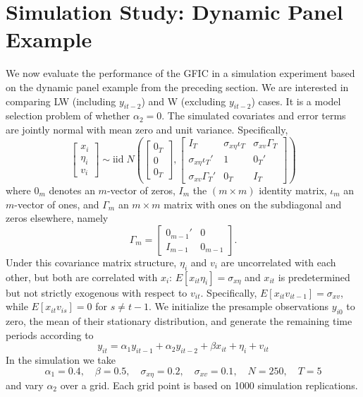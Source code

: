 \section{Simulation Study: Dynamic Panel Example}
We now evaluate the performance of the GFIC in a simulation experiment based on the dynamic panel example from the preceding section. We are interested in comparing LW (including $y_{it-2}$) and W (excluding $y_{it-2}$) cases. It is a model selection problem of whether $\alpha_2=0$. The simulated covariates and error terms are jointly normal with mean zero and unit variance. Specifically,
	\begin{equation}
		\left[\begin{array}{c}
			x_{i}\\
			\eta_i\\
			v_{i}
	 \end{array} \right]\sim \mbox{iid}\; N\left(\left[\begin{array}{c}0_T\\ 0\\ 0_T \end{array}\right] ,\left[\begin{array}{ccc}
	 	 I_T & \sigma_{x\eta}\iota_T&\sigma_{xv}\Gamma_T \\
	 		\sigma_{x\eta}\iota_T'& 1&0_T' \\
	 		\sigma_{xv}\Gamma_T'& 0_T&  I_T
	 \end{array}\right]\right)
	\end{equation}
where $0_m$ denotes an $m$-vector of zeros, $I_m$ the $(m\times m)$ identity matrix, $\iota_m$ an $m$-vector of ones, and $\Gamma_m$ an $m\times m$ matrix with ones on the subdiagonal and zeros elsewhere, namely
	\begin{equation}
		\Gamma_m = \left[\begin{array}{cc}
	 	0_{m-1}' & 0\\
	 	I_{m-1} & 0_{m-1}
	 \end{array}\right].
	\end{equation}
Under this covariance matrix structure, $\eta_i$ and $v_{i}$ are uncorrelated with each other, but both are correlated with $x_{i}$: $E[x_{it}\eta_i]=\sigma_{x\eta}$ and $x_{it}$ is predetermined but not strictly exogenous with respect to $v_{it}$. Specifically, $E[x_{it}v_{it-1}]=\sigma_{xv}$, while $E[x_{it}v_{is}]=0$ for $s\neq t-1$. We initialize the presample observations $y_{i0}$ to zero, the mean of their stationary distribution, and generate the remaining time periods according to 
$$y_{it} = \alpha_1 y_{it-1} +\alpha_2 y_{it-2} + \beta x_{it} + \eta_i + v_{it}$$
In the simulation we take
 \[ 
 \alpha_1 = 0.4,\quad \beta = 0.5,\quad \sigma_{x\eta}=0.2,\quad \sigma_{xv}=0.1,\quad N=250,\quad T=5
 \]  
 and vary $\alpha_2$ over a grid. Each grid point is based on 1000 simulation replications.

